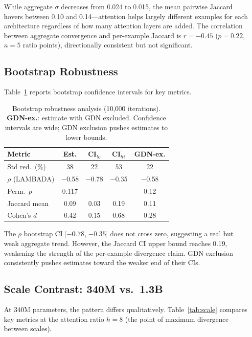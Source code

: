 \documentclass[11pt,a4paper]{article}
\begin{document}
While aggregate $\sigma$ decreases from 0.024 to 0.015, the mean pairwise Jaccard hovers between 0.10 and 0.14---attention helps largely different examples for each architecture regardless of how many attention layers are added.
The correlation between aggregate convergence and per-example Jaccard is $r = -0.45$ ($p = 0.22$, $n = 5$ ratio points), directionally consistent but not significant.

\subsection{Bootstrap Robustness}

Table~\ref{tab:bootstrap} reports bootstrap confidence intervals for key metrics.

\begin{table}[t]
\centering
\small
\begin{tabular}{lcccc}
\toprule
\textbf{Metric} & \textbf{Est.} & \textbf{CI$_{lo}$} & \textbf{CI$_{hi}$} & \textbf{GDN-ex.} \\
\midrule
Std red.\ (\%) & 38 & 22 & 53 & 22 \\
$\rho$ (LAMBADA) & $-$0.58 & $-$0.78 & $-$0.35 & $-$0.58 \\
Perm.\ $p$ & 0.117 & -- & -- & 0.12 \\
Jaccard mean & 0.09 & 0.03 & 0.19 & 0.11 \\
Cohen's $d$ & 0.42 & 0.15 & 0.68 & 0.28 \\
\bottomrule
\end{tabular}
\caption{Bootstrap robustness analysis (10,000 iterations). \textbf{GDN-ex.}: estimate with GDN excluded. Confidence intervals are wide; GDN exclusion pushes estimates to lower bounds.}
\label{tab:bootstrap}
\end{table}

The $\rho$ bootstrap CI [$-0.78$, $-0.35$] does not cross zero, suggesting a real but weak aggregate trend.
However, the Jaccard CI upper bound reaches 0.19, weakening the strength of the per-example divergence claim.
GDN exclusion consistently pushes estimates toward the weaker end of their CIs.

\subsection{Scale Contrast: 340M vs.\ 1.3B}
\label{sec:scale}

At 340M parameters, the pattern differs qualitatively.
Table~\ref{tab:scale} compares key metrics at the attention ratio $h=8$ (the point of maximum divergence between scales).
\end{document}
